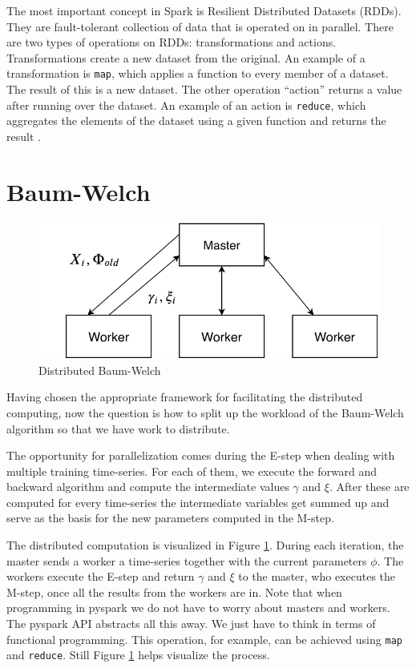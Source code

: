 The most important concept in Spark is Resilient Distributed Datasets (RDDs). They are fault-tolerant collection of data that is operated on in parallel. There are two types of operations on RDDs: transformations and actions. Transformations create a new dataset from the original. An example of a transformation is \texttt{map}, which applies a function to every member of a dataset. The result of this is a new dataset. The other operation ``action'' returns a value after running over the dataset. An example of an action is \texttt{reduce}, which aggregates the elements of the dataset using a given function and returns the result \parencite{rddguide}.

\section{Baum-Welch}
\label{section:distributed-hmm}

\begin{figure}
  \centering
  \includegraphics{figures/distributed.pdf}
  \caption{Distributed Baum-Welch}
  \label{fig:distributed}
\end{figure}

Having chosen the appropriate framework for facilitating the distributed computing, now the question is how to split up the workload of the Baum-Welch algorithm so that we have work to distribute. 

The opportunity for parallelization comes during the E-step when dealing with multiple training time-series. For each of them, we execute the forward and backward algorithm and compute the intermediate values $\gamma$ and $\xi$. After these are computed for every time-series the intermediate variables get summed up and serve as the basis for the new parameters computed in the M-step.

The distributed computation is visualized in Figure \ref{fig:distributed}. During each iteration, the master sends a worker a time-series together with the current parameters $\phi$. The workers execute the E-step and return $\gamma$ and $\xi$ to the master, who executes the M-step, once all the results from the workers are in. Note that when programming in pyspark we do not have to worry about masters and workers. The pyspark API abstracts all this away. We just have to think in terms of functional programming. This operation, for example, can be achieved using \texttt{map} and \texttt{reduce}. Still Figure \ref{fig:distributed} helps visualize the process. 

